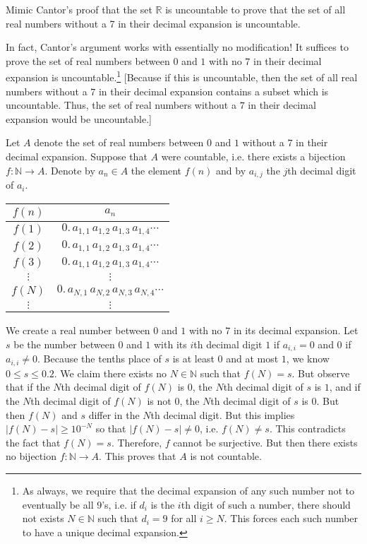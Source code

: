 \documentclass[11pt,letterpaper]{article}
\begin{document}
\newpage



 Mimic Cantor's proof that the set $\mathbb{R}$ is uncountable to prove that the set of all real numbers without a 7 in their decimal expansion is uncountable. \pspace

\sol In fact, Cantor's argument works with essentially no modification! It suffices to prove the set of real numbers between $0$ and $1$ with no $7$ in their decimal expansion is uncountable.\footnote{As always, we require that the decimal expansion of any such number not to eventually be all $9$'s, i.e. if $d_i$ is the $i$th digit of such a number, there should not exists $N \in \mathbb{N}$ such that $d_i= 9$ for all $i \geq N$. This forces each such number to have a unique decimal expansion.} [Because if this is uncountable, then the set of all real numbers without a $7$ in their decimal expansion contains a subset which is uncountable. Thus, the set of real numbers without a $7$ in their decimal expansion would be uncountable.] \pspace

Let $A$ denote the set of real numbers between $0$ and $1$ without a $7$ in their decimal expansion. Suppose that $A$ were countable, i.e. there exists a bijection $f: \mathbb{N} \to A$. Denote by $a_n \in A$ the element $f(n)$ and by $a_{i,j}$ the $j$th decimal digit of $a_i$. \par
	\begin{table}[ht]
	\centering
	\begin{tabular}{cc}
	$f(n)$ & $a_n$ \\ \hline
	$f(1)$ & $0. \, a_{1,1} \, a_{1,2} \, a_{1,3} \, a_{1,4} \cdots$ \\
	$f(2)$ & $0. \, a_{1,1} \, a_{1,2} \, a_{1,3} \, a_{1,4} \cdots$ \\
	$f(3)$ & $0. \, a_{1,1} \, a_{1,2} \, a_{1,3} \, a_{1,4} \cdots$ \\
	$\vdots$ & $\vdots$ \\
	$f(N)$ & $0. \, a_{N,1} \, a_{N,2} \, a_{N,3} \, a_{N,4} \cdots$ \\
	$\vdots$ & $\vdots$
	\end{tabular}
	\end{table} \par
We create a real number between $0$ and $1$ with no $7$ in its decimal expansion. Let $s$ be the number between $0$ and $1$ with its $i$th decimal digit $1$ if $a_{i,i}= 0$ and $0$ if $a_{i,i} \neq 0$. Because the tenths place of $s$ is at least $0$ and at most $1$, we know $0 \leq s \leq 0.2$. We claim there exists no $N \in \mathbb{N}$ such that $f(N)= s$. But observe that if the $N$th decimal digit of $f(N)$ is $0$, the $N$th decimal digit of $s$ is $1$, and if the $N$th decimal digit of $f(N)$ is not $0$, the $N$th decimal digit of $s$ is $0$. But then $f(N)$ and $s$ differ in the $N$th decimal digit. But this implies $|f(N) - s| \geq 10^{-N}$ so that $|f(N) - s| \neq 0$, i.e. $f(N) \neq s$. This contradicts the fact that $f(N)= s$. Therefore, $f$ cannot be surjective. But then there exists no bijection $f: \mathbb{N} \to A$. This proves that $A$ is not countable. 
\end{document}
